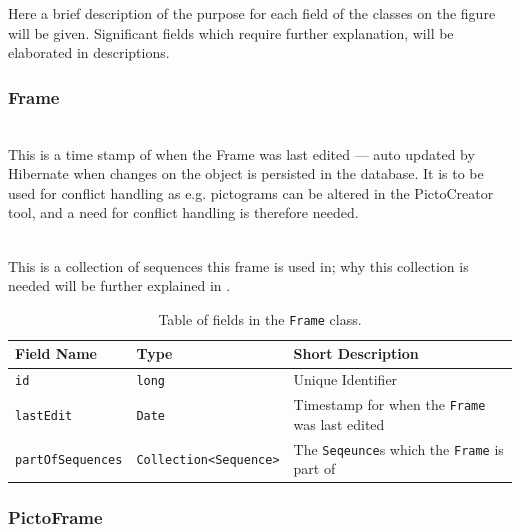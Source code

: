 Here a brief description of the purpose for each field of the classes on the figure will be given.
Significant fields which require further explanation, will be elaborated in descriptions.

\subsubsection*{Frame}
    \begin{description}[font=\ttfamily\bfseries]
        \item[lastEditAt] \hfill \\ This is a time stamp of when the Frame was last edited --- auto updated by Hibernate when changes on the object is persisted in the database.
        It is to be used for conflict handling as e.g. pictograms can be altered in the PictoCreator tool, and a need for conflict handling is therefore needed.
        \item[partofSequences] \hfill \\ This is a collection of sequences this frame is used in; why this collection is needed will be further explained in .
    \end{description}  
\begin{table}[!h]
    \footnotesize
    \centering
    \begin{tabularx}{\textwidth}{ l l X }
        Field Name    & Type                                & Short Description                                \\
        \midrule
        \texttt{id}              & \texttt{long}                                      & Unique Identifier                                             \\
        \texttt{lastEdit}        & \texttt{Date}                                      & Timestamp for when the \texttt{Frame} was last edited  \\
        \texttt{partOfSequences} & \texttt{Collection\textless Sequence\textgreater}  & The \texttt{Seqeunce}s which the \texttt{Frame} is part of \\
    \end{tabularx}
    \caption{Table of fields in the \texttt{Frame} class.}
    \label{tbl:frame_class}
\end{table}  

\subsubsection*{PictoFrame}

